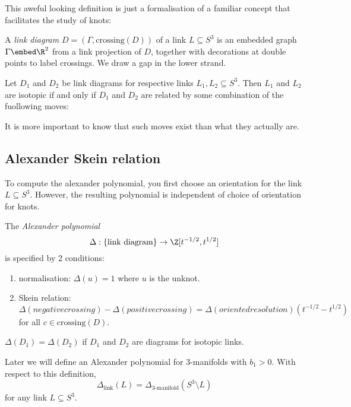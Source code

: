 \documentclass[a4paper]{article}
\begin{document}
This aweful looking definition is just a formalisation of a familiar concept that facilitates the study of knots:

\begin{definition}
  A \emph{link diagram} \(D = (\Gamma, \text{crossing} (D))\) of a link \(L \subseteq S^3\) is an embedded graph \(\Gamma \embed \R^2\) from a link projection of \(D\), together with decorations at double points to label crossings. We draw a gap in the lower strand.
\end{definition}

\begin{theorem}
  Let \(D_1\) and \(D_2\) be link diagrams for respective links \(L_1, L_2 \subseteq S^3\). Then \(L_1\) and \(L_2\) are isotopic if and only if \(D_1\) and \(D_2\) are related by some combination of the fuollowing moves:
\end{theorem}

It is more important to know that such moves exist than what they actually are.

\subsection{Alexander Skein relation}

To compute the alexander polynomial, you first choose an orientation for the link \(L \subseteq S^3\). However, the resulting polynomial is independent of choice of orientation for knots.

\begin{theorem}[Alexander]
  The \emph{Alexander polynomial}
  \[
    \Delta: \{\text{link diagram}\} \to \Z[t^{-1/2}, t^{1/2}]
  \]
  is specified by 2 conditions:
  \begin{enumerate}
  \item normalisation: \(\Delta(u) = 1\) where \(u\) is the unknot.
  \item Skein relation: \(\Delta(negative crossing) - \Delta(positive crossing) = \Delta(oriented resolution) (t^{-1/2} - t^{1/2})\) for all \(c \in \text{crossing}(D)\).
  \end{enumerate}
  \(\Delta(D_1) = \Delta(D_2)\) if \(D_1\) and \(D_2\) are diagrams for isotopic links.
\end{theorem}

\begin{theorem}
  Later we will define an Alexander polynomial for 3-manifolds with \(b_1 > 0\). With respect to this definition,
  \[
    \Delta_{\text{link}}(L) = \Delta_{\text{3-manifold}}(S^3 \setminus L)
  \]
  for any link \(L \subseteq S^3\).
\end{theorem}













\printindex
\end{document}
